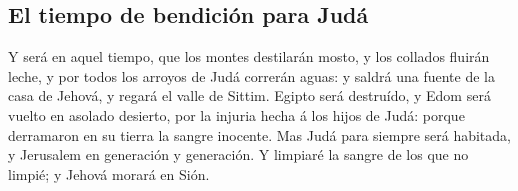 \hypertarget{el-tiempo-de-bendiciuxf3n-para-juduxe1}{%
\subsection{El tiempo de bendición para
Judá}\label{el-tiempo-de-bendiciuxf3n-para-juduxe1}}

 Y será en aquel tiempo, que los montes destilarán mosto,
y los collados fluirán leche, y por todos los arroyos de Judá correrán
aguas: y saldrá una fuente de la casa de Jehová, y regará el valle de
Sittim.  Egipto será destruído, y Edom será vuelto en
asolado desierto, por la injuria hecha á los hijos de Judá: porque
derramaron en su tierra la sangre inocente.  Mas Judá
para siempre será habitada, y Jerusalem en generación y generación.
 Y limpiaré la sangre de los que no limpié; y Jehová
morará en Sión.
